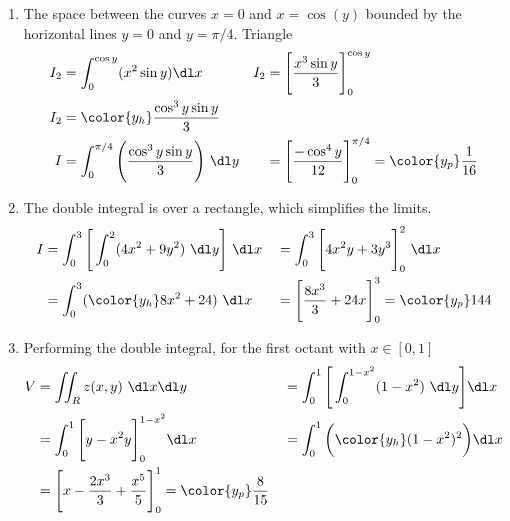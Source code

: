 \begin{enumerate}
    \item The space between the curves $ x = 0 $ and $ x = \cos(y) $ bounded by the
          horizontal lines $ y = 0 $ and $ y = \pi/4 $. Triangle
          \begin{align}
              I_2     & = \int_{0}^{\cos y}  (x^2 \sin y) \dl x                    &
              I_2     & = \Bigg[ \frac{x^3 \sin y}{3} \Bigg]_{0}^{\cos y}            \\
              I_2     & = \color{y_h} \frac{\cos^3 y \sin y}{3}                      \\
              I       & = \int_{0}^{\pi/4} \Bigg( \frac{\cos^3 y \sin y}{3} \Bigg)
              \ \dl y &
                      & = \Bigg[ \frac{-\cos^4 y}{12} \Bigg]_0^{\pi/4}
              = \color{y_p} \frac{1}{16}
          \end{align}

    \item The double integral is over a rectangle, which simplifies the limits.
          \begin{align}
              I                     & = \int_{0}^{3} \Bigg[ \int_{0}^{2} (4x^2 + 9y^2)
              \ \dl y \Bigg]\ \dl x &
                                    & = \int_{0}^{3} \Bigg[ 4x^2y + 3y^3 \Bigg]_0^2
              \ \dl x                                                                  \\
                                    & = \int_{0}^{3} ({\color{y_h} 8x^2 + 24})
              \ \dl x               &
                                    & = \Bigg[ \frac{8x^3}{3} + 24x \Bigg]_0^3
              = \color{y_p} 144
          \end{align}

    \item Performing the double integral, for the first octant with $ x \in [0, 1] $
          \begin{align}
              V & = \iint_R z(x, y)\ \dl x \dl y                               &
                & = \int_{0}^{1} \Bigg[\int_{0}^{1 - x^2} (1 - x^2)\ \dl
              y\Bigg] \dl x                                                      \\
                & = \int_{0}^{1} \Bigg[ y - x^2y \Bigg]_0^{1 - x^2} \dl x      &
                & = \int_{0}^{1} \bigg( {\color{y_h} (1 - x^2)^2} \bigg) \dl x   \\
                & = \Bigg[ x - \frac{2x^3}{3} + \frac{x^5}{5} \Bigg]_0^1 =
              \color{y_p} \frac{8}{15}
          \end{align}


\end{enumerate}
